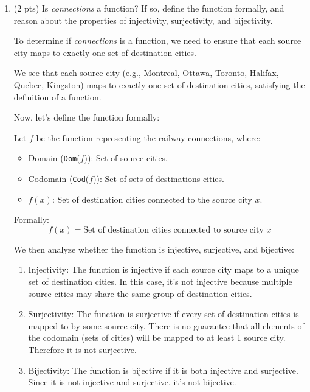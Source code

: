 \documentclass[12pt]{article}
\begin{document}
\begin{spacing}{1.5}
\begin{enumerate}
		\item (2 pts) Is \textit{connections} a function? If so, define the function formally, and reason about the properties of injectivity, surjectivity, and bijectivity.
		      
		      To determine if \textit{connections} is a function, we need to ensure that each source city maps to exactly one set of destination cities.
		      
		      We see that each source city (e.g., Montreal, Ottawa, Toronto, Halifax, Quebec, Kingston) maps to exactly one set of destination cities, satisfying the definition of a function.
		      
		      Now, let's define the function formally:
		      
		      Let $f$ be the function representing the railway connections, where:
		      
		      \begin{itemize}
		      	\item Domain (\texttt{Dom}($f$)): Set of source cities.
		      	\item Codomain (\texttt{Cod}($f$)): Set of sets of destinations cities.
		      	\item $f(x)$: Set of destination cities connected to the source city $x$.
		      \end{itemize}
		      
		      Formally:
		      $$f(x)=\text{Set of destination cities connected to source city }x$$
		      
		      We then analyze whether the function is injective, surjective, and bijective:
		      
		      \begin{enumerate}
		      	\item Injectivity: The function is injective if each source city maps to a unique set of destination cities. In this case, it's not injective because multiple source cities may share the same group of destination cities.
		      	\item Surjectivity: The function is surjective if every set of destination cities is mapped to by some source city. There is no guarantee that all elements of the codomain (sets of cities) will be mapped to at least 1 source city. Therefore it is not surjective.
		      	\item Bijectivity: The function is bijective if it is both injective and surjective. Since it is not injective and surjective, it's not bijective.
		      \end{enumerate}
		      

\end{enumerate}
\end{spacing}
\end{document}
